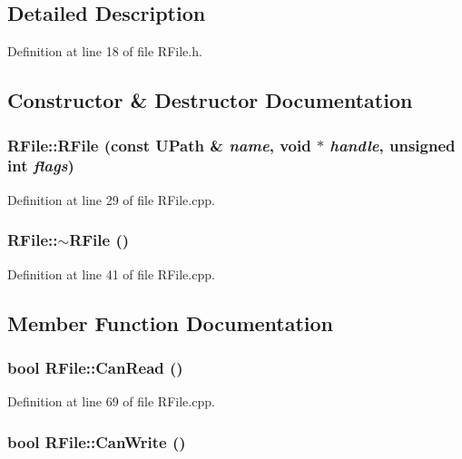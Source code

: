 \subsection{Detailed Description}


Definition at line 18 of file RFile.h.

\subsection{Constructor \& Destructor Documentation}
\hypertarget{class_r_file_ffc05913a9571ccf38ccf645a75164c4}{
\subsubsection[{RFile}]{\setlength{\rightskip}{0pt plus 5cm}RFile::RFile (const {\bf UPath} \& {\em name}, \/  void $\ast$ {\em handle}, \/  unsigned int {\em flags})}}
\label{class_r_file_ffc05913a9571ccf38ccf645a75164c4}




Definition at line 29 of file RFile.cpp.\hypertarget{class_r_file_e99ed1a7be564abbe8be041bfe76397d}{
\subsubsection[{$\sim$RFile}]{\setlength{\rightskip}{0pt plus 5cm}RFile::$\sim$RFile ()}}
\label{class_r_file_e99ed1a7be564abbe8be041bfe76397d}




Definition at line 41 of file RFile.cpp.

\subsection{Member Function Documentation}
\hypertarget{class_r_file_0e6298d7ae56e674c44c5f25b5b23b0a}{
\subsubsection[{CanRead}]{\setlength{\rightskip}{0pt plus 5cm}bool RFile::CanRead ()}}
\label{class_r_file_0e6298d7ae56e674c44c5f25b5b23b0a}




Definition at line 69 of file RFile.cpp.\hypertarget{class_r_file_66152df59b7c0b3a6a385b00f5d27397}{
\subsubsection[{CanWrite}]{\setlength{\rightskip}{0pt plus 5cm}bool RFile::CanWrite ()}}
\label{class_r_file_66152df59b7c0b3a6a385b00f5d27397}




